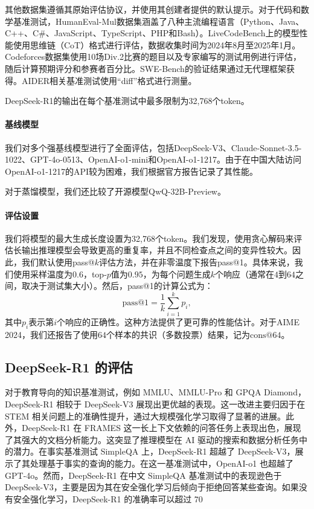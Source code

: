 \documentclass[lang=cn,a4paper,newtx]{elegantpaper}
\newcommand{\dsri}{DeepSeek-R1}
\begin{document}
其他数据集遵循其原始评估协议，并使用其创建者提供的默认提示。对于代码和数学基准测试，HumanEval-Mul数据集涵盖了八种主流编程语言（Python、Java、C++、C\#、JavaScript、TypeScript、PHP和Bash）。LiveCodeBench上的模型性能使用思维链（CoT）格式进行评估，数据收集时间为2024年8月至2025年1月。Codeforces数据集使用10场Div.2比赛的题目以及专家编写的测试用例进行评估，随后计算预期评分和参赛者百分比。SWE-Bench的验证结果通过无代理框架获得。AIDER相关基准测试使用“diff”格式进行测量。

\dsri{}的输出在每个基准测试中最多限制为32,768个token。

\paragraph{基线模型} 我们对多个强基线模型进行了全面评估，包括DeepSeek-V3、Claude-Sonnet-3.5-1022、GPT-4o-0513、OpenAI-o1-mini和OpenAI-o1-1217。由于在中国大陆访问OpenAI-o1-1217的API较为困难，我们根据官方报告记录了其性能。

对于蒸馏模型，我们还比较了开源模型QwQ-32B-Preview。

\paragraph{评估设置}  
我们将模型的最大生成长度设置为32,768个token。我们发现，使用贪心解码来评估长输出推理模型会导致更高的重复率，并且不同检查点之间的变异性较大。因此，我们默认使用pass@$k$评估方法，并在非零温度下报告pass@1。具体来说，我们使用采样温度为$0.6$，top-$p$值为$0.95$，为每个问题生成$k$个响应（通常在$4$到$64$之间，取决于测试集大小）。然后，pass@1的计算公式为：
\[
\text{pass@1} = \frac{1}{k} \sum_{i=1}^{k} p_i,
\]
其中$p_i$表示第$i$个响应的正确性。这种方法提供了更可靠的性能估计。对于AIME 2024，我们还报告了使用$64$个样本的共识（多数投票）结果，记为$\text{cons}@64$。

\subsection{\dsri{} 的评估}


对于教育导向的知识基准测试，例如 MMLU、MMLU-Pro 和 GPQA Diamond，\dsri{} 相较于 DeepSeek-V3 展现出更优越的表现。这一改进主要归因于在 STEM 相关问题上的准确性提升，通过大规模强化学习取得了显著的进展。此外，\dsri{} 在 FRAMES 这一长上下文依赖的问答任务上表现出色，展现了其强大的文档分析能力。这突显了推理模型在 AI 驱动的搜索和数据分析任务中的潜力。在事实基准测试 SimpleQA 上，\dsri{} 超越了 DeepSeek-V3，展示了其处理基于事实的查询的能力。在这一基准测试中，OpenAI-o1 也超越了 GPT-4o。然而，\dsri{} 在中文 SimpleQA 基准测试中的表现逊色于 DeepSeek-V3，主要是因为其在安全强化学习后倾向于拒绝回答某些查询。如果没有安全强化学习，\dsri{} 的准确率可以超过 70%
\end{document}
